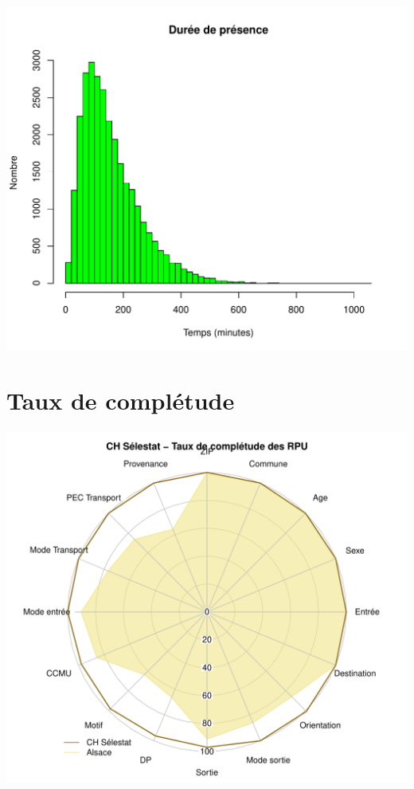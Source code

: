 \documentclass[12pt,english,french,twoside]{book}\usepackage[]{graphicx}\usepackage[]{color}
\makeatletter
\def\maxwidth{ %
  \ifdim\Gin@nat@width>\linewidth
    \linewidth
  \else
    \Gin@nat@width
  \fi
}
\newenvironment{knitrout}{}{} %
\makeatother
\begin{document}
\begin{knitrout}
\color{fgcolor}
\includegraphics[width=\maxwidth]{figure/graphe_p_sel} 

\end{knitrout}


\section*{Taux de complétude}

\begin{knitrout}
\color{fgcolor}
\includegraphics[width=\maxwidth]{figure/compl_sel} 

\end{knitrout}
\end{document}
